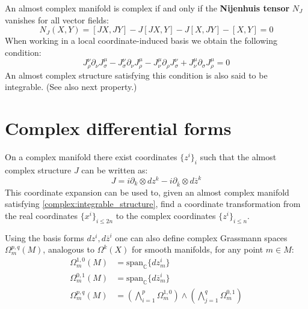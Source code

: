 	\begin{property}
		An almost complex manifold is complex if and only if the \textbf{Nijenhuis tensor} $N_J$ vanishes for all vector fields:
		\begin{equation}
			\label{complex:integrable_structure}
			N_J(X, Y) = [JX, JY] - J[JX, Y] - J[X, JY] - [X, Y] = 0
		\end{equation}
		When working in a local coordinate-induced basis we obtain the following condition:
		\begin{equation}
			J_\rho^\nu\partial_\nu J_\sigma^\mu - J_\sigma^\nu\partial_\nu J_\rho^\mu - J_\nu^\mu\partial_\rho J_\sigma^\nu + J_\nu^\mu\partial_\sigma J_\rho^\mu = 0
		\end{equation}
		An almost complex structure satisfying this condition is also said to be integrable. (See also next property.)
	\end{property}
	
\section{Complex differential forms}
	
	\begin{property}
		On a complex manifold there exist coordinates $\{z^i\}_i$ such that the almost complex structure $J$ can be written as:
		\begin{equation}
			J = i\partial_k\otimes dz^k - i\partial_{\overline{k}}\otimes d\overline{z}^k
		\end{equation}
		This coordinate expansion can be used to, given an almost complex manifold satisfying \ref{complex:integrable_structure}, find a coordinate transformation from the real coordinates $\{x^i\}_{i\leq2n}$ to the complex coordinates $\{z^i\}_{i\leq n}$.
	\end{property}

	Using the basis forms $dz^i, d\overline{z}^i$ one can also define complex Grassmann spaces $\Omega^{p, q}_m(M)$, analogous to $\Omega^k(X)$ for smooth manifolds, for any point $m\in M$:
	\begin{align}
		\Omega^{1, 0}_m(M) &= \text{span}_{\mathbb{C}}\{dz^i_m\}\\
		\Omega^{0, 1}_m(M) &= \text{span}_{\mathbb{C}}\{d\overline{z}^i_m\}\\
		\Omega^{p, q}_m(M) &= \left(\bigwedge_{i=1}^p\Omega^{1, 0}_m\right)\wedge\left(\bigwedge_{j=1}^q\Omega^{0, 1}_m\right)
	\end{align}
	
